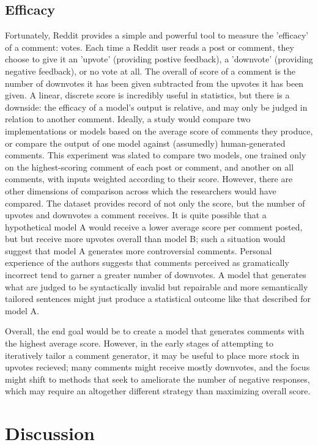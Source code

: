 \documentclass[11pt,twocolumn]{article}
\begin{document}
\subsection*{Efficacy}
Fortunately, Reddit provides a simple and powerful tool to measure the 'efficacy' of a comment: votes. Each time a Reddit user reads a post or comment, they choose to give it an 'upvote' (providing postive feedback), a 'downvote' (providing negative feedback), or no vote at all. The overall of score of a comment is the number of downvotes it has been given subtracted from the upvotes it has been given. A linear, discrete score is incredibly useful in statistics, but there is a downside: the efficacy of a model's output is relative, and may only be judged in relation to another comment. Ideally, a study would compare two implementations or models based on the average score of comments they produce, or compare the output of one model against (assumedly) human-generated comments. This experiment was slated to compare two models, one trained only on the highest-scoring comment of each post or comment, and another on all comments, with inputs weighted according to their score. However, there are other dimensions of comparison across which the researchers would have compared. The dataset provides record of not only the score, but the number of upvotes and downvotes a comment receives. It is quite possible that a hypothetical model A would receive a lower average score per comment posted, but but receive more upvotes overall than model B; such a situation would suggest that model A generates more controversial comments. Personal experience of the authors suggests that comments perceived as gramatically incorrect tend to garner a greater number of downvotes. A model that generates what are judged to be syntactically invalid but repairable and more semantically tailored sentences might just produce a statistical outcome like that described for model A.
\par  Overall, the end goal would be to create a model that generates comments with the highest average score. However, in the early stages of attempting to iteratively tailor a comment generator, it may be useful to place more stock in upvotes recieved; many comments might receive mostly downvotes, and the focus might shift to methods that seek to ameliorate the number of negative responses, which may require an altogether different strategy than maximizing overall score.  
\section{Discussion}
\end{document}
